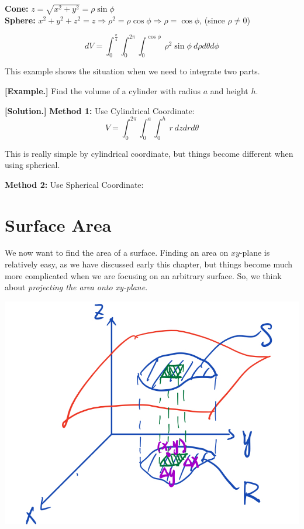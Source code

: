 \documentclass[11pt, a4paper]{MATH2023}
\newcommand{\eg}{\textbf{[Example.] }}
\newcommand{\sol}{\textbf{[Solution.] }}
\begin{document}
\begin{spacing}{1.3}
    {\bf Cone:} $z=\sqrt{x^2+y^2}=\rho \sin\phi$\\
    {\bf Sphere:} $x^2+y^2+z^2=z \Rightarrow \rho^2 = \rho \cos\phi \Rightarrow \rho=\cos\phi$, (since $\rho\ne 0$)

    $$dV=\int_0^{\frac{\pi}{4}} \int_0^{2\pi} \int_0^{\cos\phi}\ \rho^2 \sin\phi \ d\rho d\theta d\phi$$

    \newpage
    {\blue This example shows the situation when we need to integrate two parts.}

    \eg Find the volume of a cylinder with radius $a$ and height $h$.

    \sol {\bf Method 1:} Use Cylindrical Coordinate: 
    $$V=\int_0^{2\pi} \int_0^a \int_0^h\ r\ dzdrd\theta$$

    This is really simple by cylindrical coordinate, but things become different when using spherical.

    {\bf Method 2:} Use Spherical Coordinate: 

    




    

    


    \newpage
    \section{Surface Area}
    
    We now want to find the area of a surface. Finding an area on $xy$-plane is relatively easy, as we 
    have discussed early this chapter, but things become much more complicated when we are focusing
    on an arbitrary surface. So, we think about {\it projecting the area onto xy-plane}.

    \begin{center}
        \includegraphics[scale=0.24]{images/Ch14-surface-area.jpeg}
    \end{center}


\end{spacing}
\end{document}
